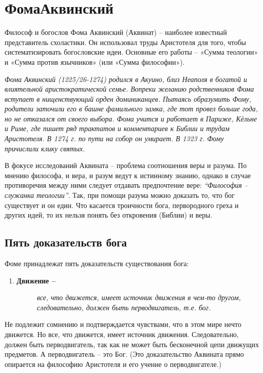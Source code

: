 \chapter{ФомаАквинский}

Философ и богослов Фома Аквинский (Аквинат) -- наиболее известный
представитель схоластики. Он использовал труды Аристотеля для того,
чтобы систематизировать богословские идеи. Основные его работы -- «Сумма
теологии» и «Сумма против язычников» (или «Сумма философии»).

\emph{Фома Аквинский (1225/26-1274) родился в Акуино, близ Неаполя в
богатой и влиятельной аристократической семье. Вопреки желанию
родственников Фома вступает в нищенствующий орден доминиканцев. Пытаясь
образумить Фому, родители заточили его в башне фамильного замка, где тот
провел больше года, но не отказался от своего выбора. Фома учится и
работает в Париже, Кёльне и Риме, где пишет ряд трактатов и комментариев к Библии и трудам Аристотеля. В 1274 г. по пути на собор он
умирает. В 1323 г. Фому причислили клику святых.}

В фокусе исследований Аквината -- проблема соотношения веры и разума. По
мнению философа, и вера, и разум ведут к истинному знанию, однако в
случае противоречия между ними следует отдавать предпочтение вере:
\emph{``Философия -- служанка теологии''}. Так, при помощи разума можно
доказать то, что бог существует и он един. Что касается троичности бога,
первородного греха и других идей, то их нельзя понять без откровения
(Библии) и веры.


\section{Пять доказательств
бога}

Фоме принадлежат пять доказательств существования бога:

\begin{enumerate}
\def\labelenumi{\arabic{enumi}.}
\item
  \begin{description}
  \item[\textbf{Движение --}]
  \emph{все, что движется, имеет источник движения в чем-то другом,
  следовательно, должен быть перводвигатель, т.е. бог.}
  \end{description}
\end{enumerate}

Не подлежит сомнению и подтверждается чувствами, что в этом мире нечто
движется. Но все, что движется, имеет источник движения. Следовательно,
должен быть перводвигатель, так как не может быть бесконечной цепи
движущих предметов. А перводвигатель -- это Бог. (Это доказательство
Аквината прямо опирается на философию Аристотеля и его учение о
перводвигателе.)

